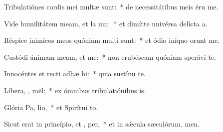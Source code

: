 \item Tribulatiónes cordis mei multæ sunt:~* de necessitátibus meis éru me.
\item Vide humilitátem meam, et la um:~* et dimítte univérsa delícta a.
\item Réspice inimícos meos quóniam multi sunt:~* et ódio iníquo orunt me.
\item Custódi ánimam meam, et  me:~* non erubéscam quóniam sperávi  te.
\item Innocéntes et recti adhæ hi:~* quia sustínu te.
\item Líbera, , raël:~* ex ómnibus tribulatiónibus is.
\item Glória Pa,  lio,~* et Spirítui to.
\item Sicut erat in princípio, et ,  per,~* et in sǽcula sæculórum. men.
